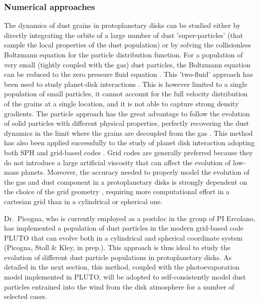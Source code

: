 \documentclass[10pt,fleqn,twoside]{article}
\begin{document}
\subsubsection{Numerical approaches}

The dynamics of dust grains in protoplanetary disks can be studied
either by directly integrating the orbits of a large number of dust
'super-particles' (that sample the local properties of the dust
population) or by solving the collisionless Boltzmann equation for the
particle distribution function. For a population of very small
(tightly coupled with the gas) dust particles, the Boltzmann equation
can be reduced to the zero pressure fluid equation 
\citep{1993Icar..106..102C, 2004ApJ...603..292G}.
This 'two-fluid' approach has been used to study
planet-disk interactions \citep[e.g.,][]{2004A&A...425L...9P, 
2006A&A...453.1129P, 2012ApJ...755....6Z}.
This is however limited to a single population of
small particles, it cannot account for the full velocity distribution
of the grains at a single location, and it is not able to capture
strong density gradients. The particle approach has the great
advantage to follow the evolution of solid particles with different
physical properties, perfectly recovering the dust dynamics in the
limit where the grains are decoupled from the gas 
\citep{2007ApJ...662..613Y, 2010JCoPh.229.3916M, 2010ApJ...722.1437B}.
This method has also been
applied successfully to the study of planet disk interaction adopting
both SPH and grid-based codes 
\citep{2007A&A...474.1037F, 2010A&A...518A..16F, 2012MNRAS.423.1450A,
2009A&A...493.1125L, 2014ApJ...795...53Z}. Grid codes are
generally preferred because they do not introduce a large artificial viscosity
that can affect the evolution of low-mass planets. Moreover, the
accuracy needed to properly model the evolution of the gas and dust
component in a protoplanetary disks is strongly dependent on the
choice of the grid geometry \citep{2009A&A...493.1125L, 
2006MNRAS.370..529D}, requiring more computational effort in a cartesian grid
than in a cylindrical or spherical one. 

Dr.\ Picogna, who is currently employed as a postdoc in the group of PI
Ercolano, has implemented a population of dust
particles in the modern grid-based code PLUTO \citep{2012A&A...545A.152M}
that can evolve both in a cylindrical and spherical coordinate system
(Picogna, Stoll \& Kley, in prep.). This approach is thus ideal to
study the evolution of different dust particle populations in
protoplanetary disks. As detailed in the next section, this method,
coupled with the photoevaporation model implemented in PLUTO, will be
adopted to self-consistently model dust particles entrained into the
wind from the disk atmosphere for a number of selected cases.
\end{document}
